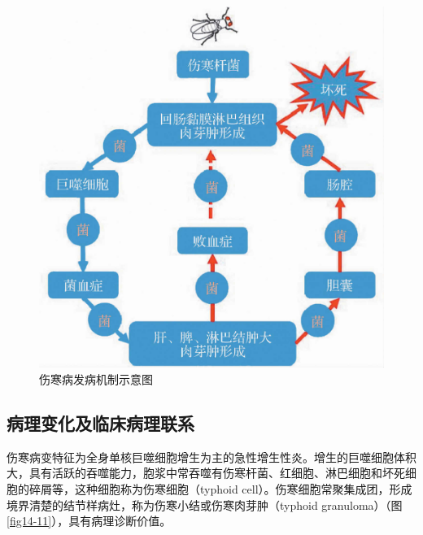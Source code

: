 \begin{figure}[!htbp]
    \centering
    \includegraphics{./images/Image00235.jpg}
    \captionsetup{justification=centering}
    \caption{伤寒病发病机制示意图}
    \label{fig14-10}
\end{figure}

\subsection{病理变化及临床病理联系}

伤寒病变特征为全身单核巨噬细胞增生为主的急性增生性炎。增生的巨噬细胞体积大，具有活跃的吞噬能力，胞浆中常吞噬有伤寒杆菌、红细胞、淋巴细胞和坏死细胞的碎屑等，这种细胞称为伤寒细胞（typhoid
cell）。伤寒细胞常聚集成团，形成境界清楚的结节样病灶，称为伤寒小结或伤寒肉芽肿（typhoid
granuloma）（图\ref{fig14-11}），具有病理诊断价值。


